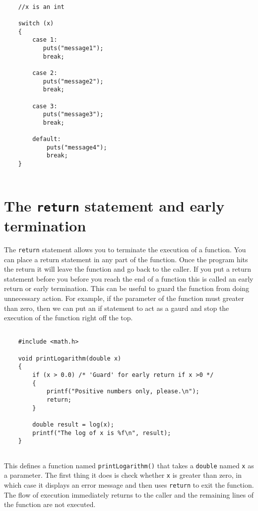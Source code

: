 \begin{verbatim}
	
    //x is an int
    
    switch (x)
    {
        case 1:
           puts("message1");
           break;
           
        case 2:
           puts("message2");
           break;
           
        case 3:
           puts("message3");
           break;
           
        default:
            puts("message4");
            break;
    }
		
\end{verbatim}
%

\section{The {\tt return} statement and early termination}

The {\tt return} statement allows you to terminate the execution
of a function. You can place a return statement in any part of the function. Once the program hits the return it will leave the function and go back to the caller. 
If you put a return statement before you before you reach the end of a function this is called an early return or early termination. This can be useful to guard the function from doing unnecessary action. For example, if the parameter of the function must greater than zero, then we can put an if statement to act as a gaurd and stop the 
execution of the function right off the top.

\begin{verbatim}

    #include <math.h> 
    
    void printLogarithm(double x) 
    {
        if (x > 0.0) /* 'Guard' for early return if x >0 */
        {
            printf("Positive numbers only, please.\n");
            return;  
        }
        
        double result = log(x);
        printf("The log of x is %f\n", result);
    }
  
\end{verbatim}
%
This defines a function named {\tt printLogarithm()} that takes
a {\tt double} named {\tt x} as a parameter.  The first thing
it does is check whether {\tt x} is greater than
zero, in which case it displays an error message and then uses
{\tt return} to exit the function.  The flow of execution
immediately returns to the caller and the remaining lines of
the function are not executed.

